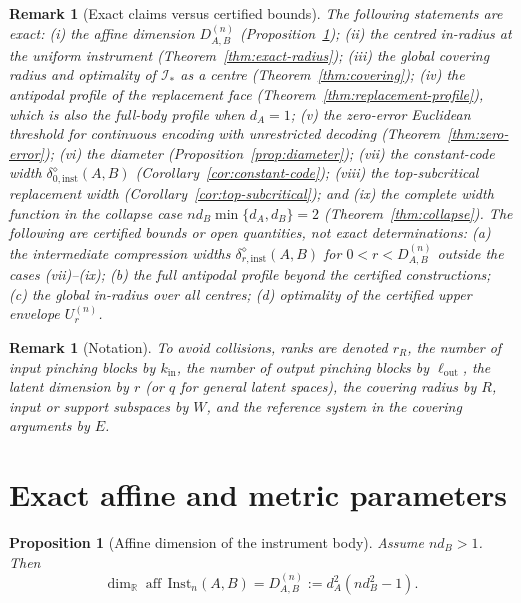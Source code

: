 \documentclass[11pt,a4paper]{article}
\newtheorem{proposition}[theorem]{Proposition}
\newtheorem{remark}[theorem]{Remark}
\newcommand{\Inst}{\mathrm{Inst}}
\newcommand{\aff}{\operatorname{aff}}
\begin{document}
\begin{remark}[Exact claims versus certified bounds]
\label{rem:exact-vs-certified}
The following statements are exact: (i) the affine dimension $D_{A,B}^{(n)}$ (Proposition~\ref{prop:dimension}); (ii) the centred in-radius at the uniform instrument (Theorem~\ref{thm:exact-radius}); (iii) the global covering radius and optimality of $\mathcal I_*$ as a centre (Theorem~\ref{thm:covering}); (iv) the antipodal profile of the replacement face (Theorem~\ref{thm:replacement-profile}), which is also the full-body profile when $d_A=1$; (v) the zero-error Euclidean threshold for continuous encoding with unrestricted decoding (Theorem~\ref{thm:zero-error}); (vi) the diameter (Proposition~\ref{prop:diameter}); (vii) the constant-code width $\delta_{0,\mathrm{inst}}^{\diamond}(A,B)$ (Corollary~\ref{cor:constant-code}); (viii) the top-subcritical replacement width (Corollary~\ref{cor:top-subcritical}); and (ix) the complete width function in the collapse case $nd_B\min\{d_A,d_B\}=2$ (Theorem~\ref{thm:collapse}). The following are certified bounds or open quantities, not exact determinations: (a) the intermediate compression widths $\delta_{r,\mathrm{inst}}^{\diamond}(A,B)$ for $0<r<D_{A,B}^{(n)}$ outside the cases (vii)--(ix); (b) the full antipodal profile beyond the certified constructions; (c) the global in-radius over all centres; (d) optimality of the certified upper envelope $U_r^{(n)}$.
\end{remark}

\begin{remark}[Notation]
\label{rem:notation}
To avoid collisions, ranks are denoted $r_R$, the number of input pinching blocks by $k_{\mathrm{in}}$, the number of output pinching blocks by $\ell_{\mathrm{out}}$, the latent dimension by $r$ (or $q$ for general latent spaces), the covering radius by $R$, input or support subspaces by $W$, and the reference system in the covering arguments by $E$.
\end{remark}

\section{Exact affine and metric parameters}
\label{sec:exact-geometry}

\begin{proposition}[Affine dimension of the instrument body]
\label{prop:dimension}
Assume $nd_B>1$. Then
\[
\dim_{\mathbb R}\aff\,\Inst_n(A,B)
=D_{A,B}^{(n)}:=d_A^2(nd_B^2-1).
\]
\end{proposition}
\end{document}
